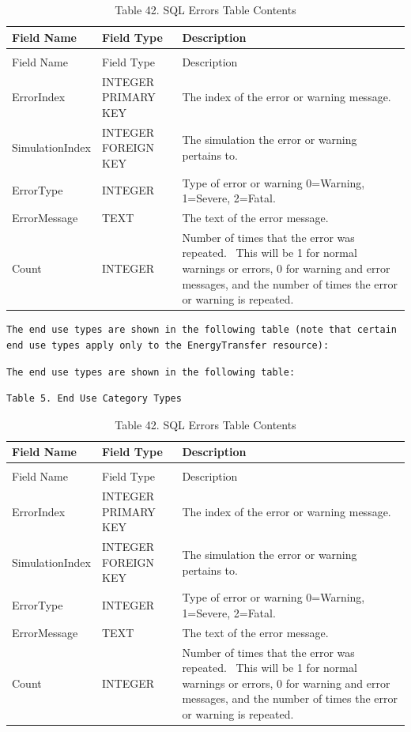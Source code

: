 \begin{longtable}[c]{p{1.5in}p{1.5in}p{2.99in}}
\caption{Table 42. SQL Errors Table Contents \label{table:table-42.-sql-errors-table-contents}} \tabularnewline
\toprule 
Field Name & Field Type & Description \tabularnewline
\midrule
\endfirsthead

\caption[]{Table 42. SQL Errors Table Contents} \tabularnewline
\toprule 
Field Name & Field Type & Description \tabularnewline
\midrule
\endhead

ErrorIndex & INTEGER PRIMARY KEY & The index of the error or warning message. \tabularnewline
SimulationIndex & INTEGER FOREIGN KEY & The simulation the error or warning pertains to. \tabularnewline
ErrorType & INTEGER & Type of error or warning 0=Warning, 1=Severe, 2=Fatal. \tabularnewline
ErrorMessage & TEXT & The text of the error message. \tabularnewline
Count & INTEGER & Number of times that the error was repeated.~ This will be 1 for normal warnings or errors, 0 for warning and error messages, and the number of times the error or warning is repeated. \tabularnewline
\bottomrule
\end{longtable}

\begin{lstlisting}
The end use types are shown in the following table (note that certain end use types apply only to the EnergyTransfer resource):
\end{lstlisting}

\begin{lstlisting}
The end use types are shown in the following table:
\end{lstlisting}

\begin{lstlisting}
Table 5. End Use Category Types
\end{lstlisting}

\begin{longtable}[c]{p{1.5in}p{1.5in}p{2.99in}}
\caption{Table 42. SQL Errors Table Contents \label{table:table-42.-sql-errors-table-contents}} \tabularnewline
\toprule 
Field Name & Field Type & Description \tabularnewline
\midrule
\endfirsthead

\caption[]{Table 42. SQL Errors Table Contents} \tabularnewline
\toprule 
Field Name & Field Type & Description \tabularnewline
\midrule
\endhead

ErrorIndex & INTEGER PRIMARY KEY & The index of the error or warning message. \tabularnewline
SimulationIndex & INTEGER FOREIGN KEY & The simulation the error or warning pertains to. \tabularnewline
ErrorType & INTEGER & Type of error or warning 0=Warning, 1=Severe, 2=Fatal. \tabularnewline
ErrorMessage & TEXT & The text of the error message. \tabularnewline
Count & INTEGER & Number of times that the error was repeated.~ This will be 1 for normal warnings or errors, 0 for warning and error messages, and the number of times the error or warning is repeated. \tabularnewline
\bottomrule
\end{longtable}

